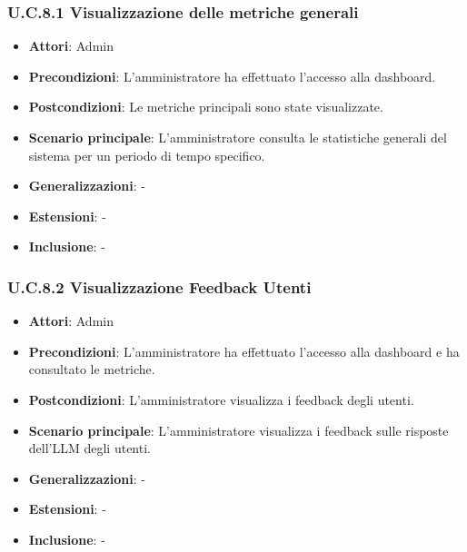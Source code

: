 \subsubsection{U.C.8.1 Visualizzazione delle metriche generali}
\begin{itemize}
    \item \textbf{Attori}: Admin
    \item \textbf{Precondizioni}: L’amministratore ha effettuato l’accesso alla dashboard.
    \item \textbf{Postcondizioni}: Le metriche principali sono state visualizzate.
    \item \textbf{Scenario principale}: L’amministratore consulta le statistiche generali del sistema per un periodo di tempo specifico.
    \item \textbf{Generalizzazioni}: -
    \item \textbf{Estensioni}: -
    \item \textbf{Inclusione}: -
\end{itemize}
\subsubsection{U.C.8.2 Visualizzazione Feedback Utenti}
\begin{itemize}
    \item \textbf{Attori}: Admin
    \item \textbf{Precondizioni}: L’amministratore ha effettuato l’accesso alla dashboard e ha consultato le metriche.
    \item \textbf{Postcondizioni}: L’amministratore visualizza i feedback degli utenti.
    \item \textbf{Scenario principale}: L’amministratore visualizza i feedback sulle risposte dell’LLM degli utenti.
    \item \textbf{Generalizzazioni}: -
    \item \textbf{Estensioni}: -
    \item \textbf{Inclusione}: -
\end{itemize}
